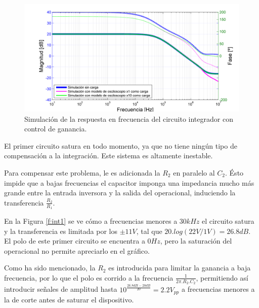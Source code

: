 \begin{figure}[H]
  \centering
\includegraphics[width=1.1\textwidth]{gfx_22/INT2_F}
  \caption{Simulación de la respuesta en frecuencia del circuito integrador con control de ganancia.}
  \label{f:int2}
\end{figure}



El primer circuito satura en todo momento, ya que no tiene ningún tipo de compensación a la integración. Este sistema es altamente inestable.

Para compensar este problema, le es adicionada la $R_2$ en paralelo al $C_2$. Ésto impide que a bajas frecuencias el capacitor imponga una impedancia mucho más grande entre la entrada inversora y la salida del operacional, induciendo la transferencia $\frac{R_2}{R_1}$.




En la Figura \ref{f:int1} se ve cómo a frecuencias menores a $30kHz$ el circuito satura y la transferencia es limitada por los $\pm11V$, tal que $20.log(22V/1V)=26.8dB$. El polo de este primer circuito se encuentra a $0Hz$, pero la saturación del operacional no permite apreciarlo en el gráfico.

Como ha sido mencionado, la $R_2$ es introducida para limitar la ganancia a baja frecuencia, por lo que el polo es corrido a la frecuencia $\frac{1}{2\pi.R_2.C_2}$, permitiendo así introducir señales de amplitud hasta $10^{\frac{26.8dB-20dB}{20}}=2.2V_{pp}$ a frecuencias menores a la de corte antes de saturar el dispositivo.








